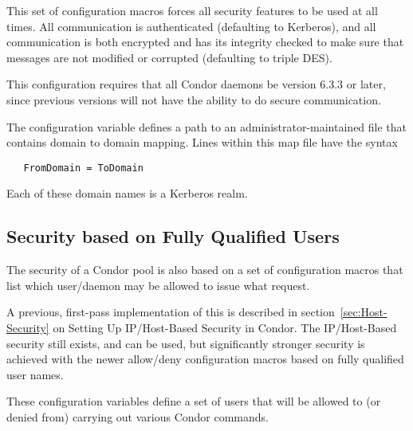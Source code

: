 This set of configuration macros forces all security features
to be used at all times.
All communication is authenticated (defaulting to Kerberos),
and all communication is both encrypted and has its
integrity checked to make sure that messages
are not modified or corrupted (defaulting to triple DES).

This configuration requires that all Condor daemons be
version 6.3.3 or later, since previous versions will not have
the ability to do secure communication.

The configuration variable
defines a path to an administrator-maintained file that
contains domain to domain mapping.
Lines within this map file have the syntax
\begin{verbatim}
   FromDomain = ToDomain
\end{verbatim}
Each of these domain names is a Kerberos realm.


\subsection{\label{sec:Security-FQU}Security based on Fully Qualified Users}

The security of a Condor pool is also based on a set of configuration
macros that list which user/daemon may be allowed to issue what request.

A previous, first-pass implementation of this is described in
section~\ref{sec:Host-Security}
on Setting Up IP/Host-Based Security in Condor.
The IP/Host-Based security still exists, and can be used,
but significantly stronger security is achieved with the newer allow/deny 
configuration macros based on fully qualified user names.

These configuration variables define a set of users that will be
allowed to (or denied from) carrying out various Condor commands.


